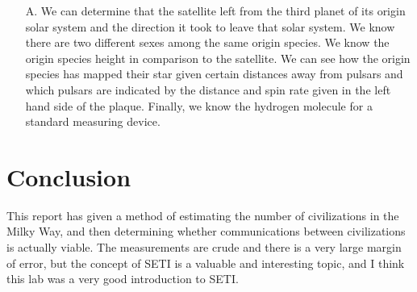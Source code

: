 \documentclass{article}
\begin{document}
\begin{enumerate}
\item[A.] We can determine that the satellite left from the third planet of its origin solar system and the direction it took
to leave that solar system. We know there are two different sexes among the same origin species. We know the origin
species height in comparison to the satellite. We can see how the origin species has mapped their star given certain
distances away from pulsars and which pulsars are indicated by the distance and spin rate given in the left hand side
of the plaque. Finally, we know the hydrogen molecule for a standard measuring device.
\end{enumerate}


\section{Conclusion}
This report has given a method of estimating the number of civilizations in the Milky Way, and then determining whether communications between civilizations is actually viable.  The measurements are crude and there is a very large margin of error, but the concept of SETI is a valuable and interesting topic, and I think this lab was a very good introduction to SETI.
\end{document}
